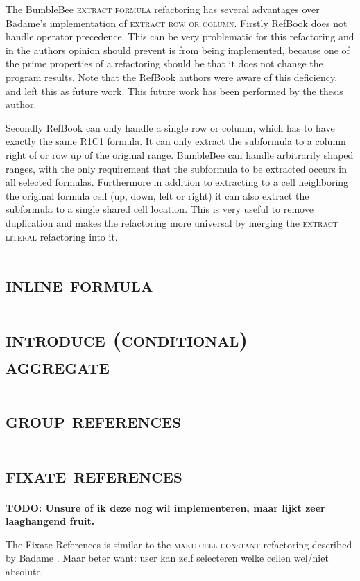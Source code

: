 \documentclass[12pt,a4paper,onecolumn,oneside,parskip]{memoir}
\newcommand{\todo}[1]{\textbf{TODO: #1}}
\newcommand{\rf}[1]{\textsc{\lowercase{#1}}}
\begin{document}
The BumbleBee \rf{Extract Formula} refactoring has several advantages over Badame's implementation of \rf{Extract row or column}.
Firstly RefBook does not handle operator precedence.
This can be very problematic for this refactoring and in the authors opinion should prevent is from being implemented, because one of the prime properties of a refactoring should be that it does not change the program results.
Note that the RefBook authors were aware of this deficiency, and left this as future work.
This future work has been performed by the thesis author.

Secondly RefBook can only handle a single row or column, which has to have exactly the same R1C1 formula. It can only extract the subformula to a column right of or row up of the original range.
BumbleBee can handle arbitrarily shaped ranges, with the only requirement that the subformula to be extracted occurs in all selected formulas.
Furthermore in addition to extracting to a cell neighboring the original formula cell (up, down, left or right) it can also extract the subformula to a single shared cell location.
This is very useful to remove duplication and makes the refactoring more universal by merging the \rf{extract literal} refactoring into it.

\section{\rf{Inline formula}}

\section{\rf{Introduce (Conditional) Aggregate}}

\section{\rf{Group References}}

\section{\rf{Fixate References}}

\todo{Unsure of ik deze nog wil implementeren, maar lijkt zeer laaghangend fruit.}

The Fixate References is similar to the \rf{Make Cell Constant} refactoring described by Badame \cite{badame2012refactoring}.
Maar beter want: user kan zelf selecteren welke cellen wel/niet absolute.
\end{document}
